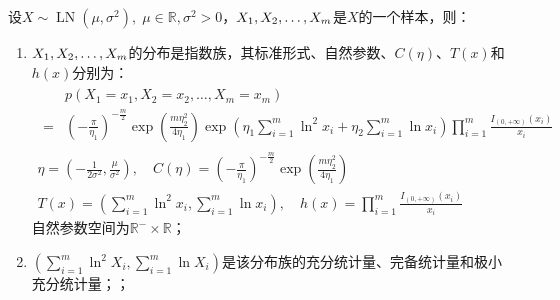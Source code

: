 \begin{theorem}
	设$X\sim\operatorname{LN}(\mu,\sigma^2),\;\mu\in\mathbb{R},\sigma^2>0$，$X_1, X_2, \dots, X_{m}$是$X$的一个样本，则：
	\begin{enumerate}
		\item $X_1, X_2, \dots, X_{m}$的分布是指数族，其标准形式、自然参数、$C(\eta)$、$T(x)$和$h(x)$分别为：
		\begin{gather*}
			\begin{aligned}
				&p(X_1=x_1,X_2=x_2,\dots,X_m=x_m) \\
				=&\left(-\frac{\pi}{\eta_1}\right)^{-\frac{m}{2}}\exp\left(\frac{m\eta_2^2}{4\eta_1}\right)\exp\left(\eta_1\sum_{i=1}^{m}\ln^2 x_i+\eta_2\sum_{i=1}^{m}\ln x_i\right)\prod_{i=1}^{m}\frac{I_{(0,+\infty)}(x_i)}{x_i}
			\end{aligned} \\
			\eta=\left(-\frac{1}{2\sigma^2},\frac{\mu}{\sigma^2}\right),\quad C(\eta)=\left(-\frac{\pi}{\eta_1}\right)^{-\frac{m}{2}}\exp\left(\frac{m\eta_2^2}{4\eta_1}\right) \\
			T(x)=\left(\sum_{i=1}^{m}\ln^2 x_i,\sum_{i=1}^{m}\ln x_i\right),\quad h(x)=\prod_{i=1}^{m}\frac{I_{(0,+\infty)}(x_i)}{x_i}
		\end{gather*}
		自然参数空间为$\mathbb{R}^{-}\times\mathbb{R}$；
		\item $\left(\sum\limits_{i=1}^{m}\ln^2 X_i,\sum\limits_{i=1}^{m}\ln X_i\right)$是该分布族的充分统计量、完备统计量和极小充分统计量；；
	\end{enumerate}
\end{theorem}
